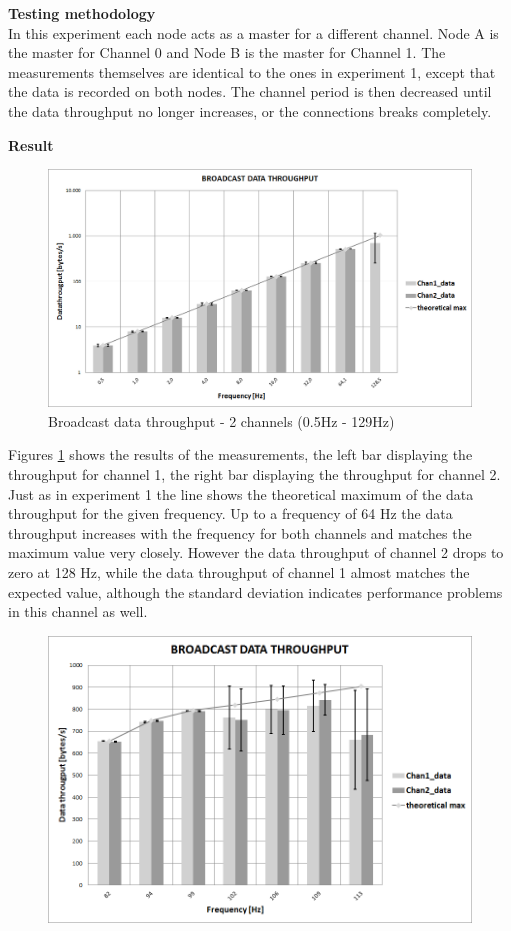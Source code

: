 \begin{description}
	\item{\textbf{Testing methodology}} \hfill \\ In this experiment each node acts as a master for a different channel. Node A is the master for Channel 0 and Node B is the master for Channel 1. The measurements themselves are identical to the ones in experiment 1, except that the data is recorded on both nodes. The channel period is then decreased until the data throughput no longer increases, or the connections breaks completely.
	\newpage
	\item{\textbf{Result}} \hfill \\  	
	\begin{figure}[H]
		\centering
		\includegraphics[scale=0.5]{content/images/exp2_norm.png}
		\caption{Broadcast data throughput - 2 channels (0.5Hz - 129Hz)}\label{fig:exp2low}
	\end{figure}
	Figures \ref{fig:exp2low} shows the results of the measurements, the left bar displaying the throughput for channel 1, the right bar displaying the throughput for channel 2. Just as in experiment 1 the  line shows the theoretical maximum of the data throughput for the given frequency. Up to a frequency of 64 Hz the data throughput increases with the frequency for both channels and matches the maximum value very closely. However the data throughput of channel 2  drops to zero at 128 Hz, while the data throughput of channel 1 almost matches the expected value, although the standard deviation indicates performance problems in this channel as well.
		\begin{figure}[H]
			\centering
			\includegraphics[scale=0.5]{content/images/exp2_detail.png}

\end{figure}
\end{description}
